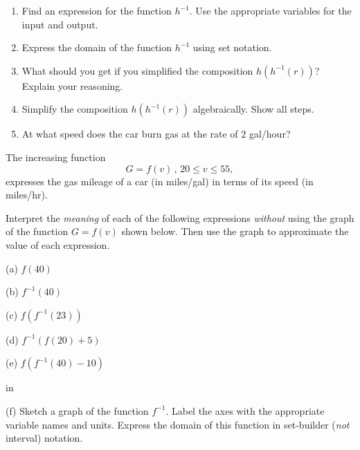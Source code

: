 \documentclass{ximera}
\newcommand{\pskip}{\vskip 0.1 in}
\begin{document}
\begin{example}
\begin{enumerate}
\item Find an expression for the function $h^{-1}$. Use the appropriate variables for the input and output.

\item Express the domain of the function $h^{-1}$ using set notation.

\item What should you get if you simplified the composition $h(h^{-1}(r))$? Explain your reasoning.

\item Simplify the composition $h(h^{-1}(r))$ algebraically. Show all steps.

\item At what speed does the car burn gas at the rate of $2$ gal/hour?

\end{enumerate}

\end{example}


\begin{example}  \label{Ex:9dfctghgh}
The increasing function
\[
   G = f(v) \,  , \, 20\leq v \leq 55 ,
\]
expresses the gas mileage of a car (in  miles/gal) in terms of its speed (in miles/hr). 

Interpret the \emph{meaning} of each of the following expressions \emph{without} using the graph of the function $G=f(v)$ shown below. Then use the graph to approximate the value of each expression.

(a) $f(40)$

(b) $f^{-1}(40)$

(c) $f(f^{-1}(23))$

(d) $f^{-1}(f(20) + 5)$

(e) $f(f^{-1}(40)-10)$

\begin{onlineOnly}
    \begin{center}
\end{center}
\end{onlineOnly}

\pskip

(f) Sketch a graph of the function $f^{-1}$. Label the axes with the appropriate variable names and units. Express the domain of this function in set-builder (\emph{not} interval) notation.

\end{example}
\end{document}
